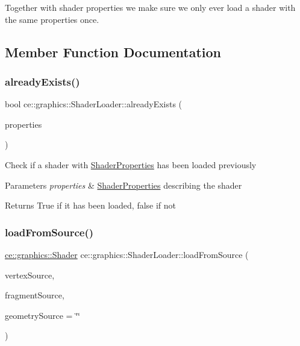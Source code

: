 Together with shader properties we make sure we only ever load a shader with the same properties once. 

\subsection{Member Function Documentation}
\mbox{\label{classce_1_1graphics_1_1_shader_loader_ae01c71a34d77e36b5aafc142214c6595}} 
\subsubsection{\texorpdfstring{already\+Exists()}{alreadyExists()}}
{\footnotesize\ttfamily bool ce\+::graphics\+::\+Shader\+Loader\+::already\+Exists (\begin{DoxyParamCaption}\item[{\hyperlink{structce_1_1graphics_1_1_shader_properties}{Shader\+Properties}}]{properties }\end{DoxyParamCaption})}

Check if a shader with \hyperlink{structce_1_1graphics_1_1_shader_properties}{Shader\+Properties} has been loaded previously


\begin{DoxyParams}{Parameters}
{\em properties} & \hyperlink{structce_1_1graphics_1_1_shader_properties}{Shader\+Properties} describing the shader \\
\hline
\end{DoxyParams}
\begin{DoxyReturn}{Returns}
True if it has been loaded, false if not 
\end{DoxyReturn}
\mbox{\label{classce_1_1graphics_1_1_shader_loader_a310a1f7e9478516bc85d03c4a08e6b21}} 
\subsubsection{\texorpdfstring{load\+From\+Source()}{loadFromSource()}}
{\footnotesize\ttfamily \hyperlink{classce_1_1graphics_1_1_shader}{ce\+::graphics\+::\+Shader} ce\+::graphics\+::\+Shader\+Loader\+::load\+From\+Source (\begin{DoxyParamCaption}\item[{const G\+Lchar $\ast$}]{vertex\+Source,  }\item[{const G\+Lchar $\ast$}]{fragment\+Source,  }\item[{const G\+Lchar $\ast$}]{geometry\+Source = {\ttfamily \char`\"{}\char`\"{}} }\end{DoxyParamCaption})\hspace{0.3cm}{\ttfamily [protected]}}




